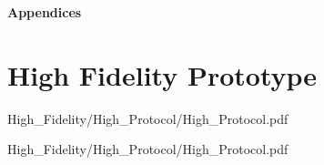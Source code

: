 \documentclass[a4 paper, 12pt]{article}
\begin{document}
\pagebreak
\begin{center}
    \Huge \textbf{Appendices}
    \section{High Fidelity Prototype}
\end{center}


    \pagebreak     
    
                    {High_Fidelity/High_Protocol/High_Protocol.pdf}
                    \label{sec:C.1}
    
                    {High_Fidelity/High_Protocol/High_Protocol.pdf}

    \pagebreak     
    
                \label{sec:C.2}
    

    \pagebreak     
    
                \label{sec:C.3}
    
\end{document}
